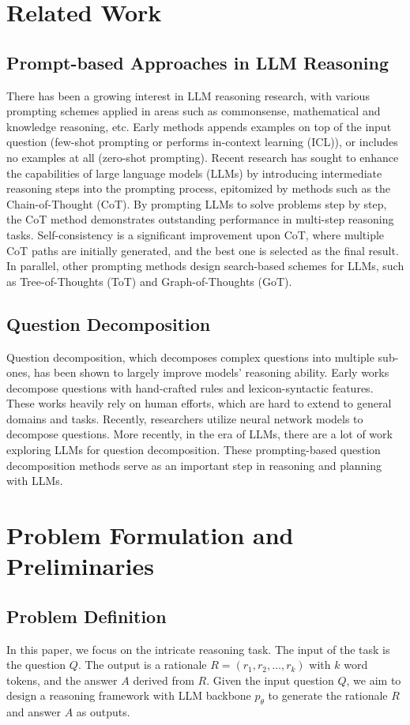 \documentclass{article}
\begin{document}
\section{Related Work}
\subsection{Prompt-based Approaches in LLM Reasoning}
There has been a growing interest in LLM reasoning research, with various prompting schemes applied in areas such as commonsense, mathematical and knowledge reasoning, etc. Early methods appends examples on top of the input question (few-shot prompting or performs in-context learning (ICL)), or includes no examples at all (zero-shot prompting). Recent research has sought to enhance the capabilities of large language models (LLMs) by introducing intermediate reasoning steps into the prompting process, epitomized by methods such as the Chain-of-Thought (CoT). By prompting LLMs to solve problems step by step, the CoT method demonstrates outstanding performance in multi-step reasoning tasks. Self-consistency is a significant improvement upon CoT, where multiple CoT paths are initially generated, and the best one is selected as the final result. In parallel, other prompting methods design search-based schemes for LLMs, such as Tree-of-Thoughts (ToT) and Graph-of-Thoughts (GoT).

\subsection{Question Decomposition}
Question decomposition, which decomposes complex questions into multiple sub-ones, has been shown to largely improve models' reasoning ability. Early works decompose questions with hand-crafted rules and lexicon-syntactic features. These works heavily rely on human efforts, which are hard to extend to general domains and tasks. Recently, researchers utilize neural network models to decompose questions. More recently, in the era of LLMs, there are a lot of work exploring LLMs for question decomposition. These prompting-based question decomposition methods serve as an important step in reasoning and planning with LLMs.

\section{Problem Formulation and Preliminaries}
\subsection{Problem Definition}
In this paper, we focus on the intricate reasoning task. The input of the task is the question $Q$. The output is a rationale $R=(r_1, r_2, \dots, r_k)$ with $k$ word tokens, and the answer $A$ derived from $R$. Given the input question $Q$, we aim to design a reasoning framework with LLM backbone $p_\theta$ to generate the rationale $R$ and answer $A$ as outputs.
\end{document}
